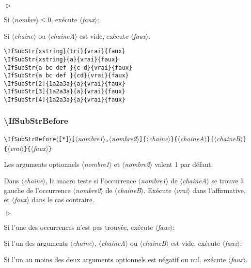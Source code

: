 \documentclass[a4paper,10pt]{article}
\newcommand\argu[1]{$\langle$\textit{#1}$\rangle$}
\newcommand\ARGU[1]{\texttt{\color{black}\{}\argu{#1}\texttt{\color{black}\}}}
\newcommand\arguCC[2]{\texttt{\color{black}[}\argu{#1}\texttt{\color{black},}\argu{#2}\texttt{\color{black}]}}
\newcommand\etoile{$\langle$\texttt{[*]}$\rangle$}
\newenvironment{Conditions}[1][1cm]%
{\begin{list}%
	{$\vartriangleright$}%
	{\setlength{\leftmargin}{#1}
	 \setlength{\itemsep}{0pt}
	 \setlength{\parsep}{0pt}
	 \setlength{\topsep}{2ptplus3ptminus2pt}
	}}%
{\end{list}}
\newcommand\styleexemple{\small\vskip4pt}
\newcommand\verbinline{\lstinline[basicstyle=\normalsize\ttfamily]}
\begin{document}
\begin{Conditions}
	\item Si \argu{nombre}${}\leqslant0$,  exécute \argu{faux};
	\item Si \argu{chaine} ou \argu{chaineA} est vide, exécute \argu{faux}.
\end{Conditions}

\begin{minipage}[t]{0.65\linewidth}
\begin{lstlisting}
\IfSubStr{xstring}{tri}{vrai}{faux}
\IfSubStr{xstring}{a}{vrai}{faux}
\IfSubStr{a bc def }{c d}{vrai}{faux}
\IfSubStr{a bc def }{cd}{vrai}{faux}
\IfSubStr[2]{1a2a3a}{a}{vrai}{faux}
\IfSubStr[3]{1a2a3a}{a}{vrai}{faux}
\IfSubStr[4]{1a2a3a}{a}{vrai}{faux}
\end{lstlisting}%
\end{minipage}\hfill
\begin{minipage}[t]{0.35\linewidth}
	\styleexemple
	\par
	\par
	\par
	\par
	\par
	\par
\end{minipage}%

\subsubsection{\ttfamily\textbackslash IfSubStrBefore}
\verbinline|\IfSubStrBefore|\etoile\arguCC{nombre1}{nombre2}\ARGU{chaine}\ARGU{chaineA}\ARGU{chaineB}\ARGU{vrai}\ARGU{faux}
\smallskip

Les arguments optionnels \argu{nombre1} et \argu{nombre2} valent 1 par défaut.\par\nobreak\smallskip
Dans \argu{chaine}, la macro teste si l'occurrence \no\argu{nombre1} de \argu{chaineA} se trouve à gauche de l'occurrence \no\argu{nombre2} de \argu{chaineB}. Exécute \argu{vrai} dans l'affirmative, et \argu{faux} dans le cas contraire.\medskip

\begin{Conditions}
	\item Si l'une des occurrences n'est pas trouvée, exécute \argu{faux};
	\item Si l'un des arguments \argu{chaine}, \argu{chaineA} ou \argu{chaineB} est vide, exécute \argu{faux};
	\item Si l'un au moins des deux arguments optionnels est négatif ou nul, exécute \argu{faux}.
\end{Conditions}
\end{document}
